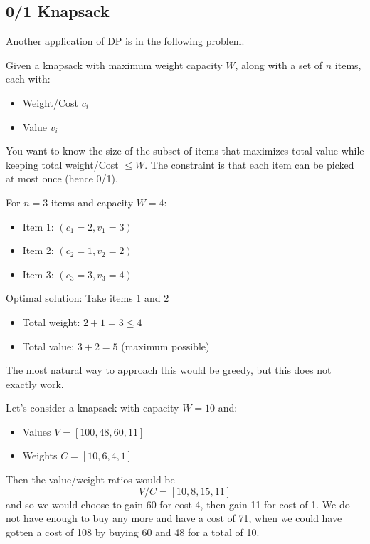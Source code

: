 \subsection{0/1 Knapsack} 

  Another application of DP is in the following problem. 

  \begin{definition}[0/1 Knapsack]
    \label{def:0-1-knapsack}
    Given a knapsack with maximum weight capacity $W$, along with a set of $n$ items, each with:
    \begin{itemize}
      \item Weight/Cost $c_i$
      \item Value $v_i$
    \end{itemize}
    You want to know the size of the subset of items that maximizes total value while keeping total weight/Cost $\leq W$. The constraint is that each item can be picked at most once (hence 0/1). 
  \end{definition}

  \begin{example}
    \label{ex:a-small-knapsack-instance}
    For $n = 3$ items and capacity $W = 4$:
    \begin{itemize}
      \item Item 1: $(c_1 = 2, v_1 = 3)$
      \item Item 2: $(c_2 = 1, v_2 = 2)$
      \item Item 3: $(c_3 = 3, v_3 = 4)$
    \end{itemize}
    Optimal solution: Take items 1 and 2
    \begin{itemize}
      \item Total weight: $2 + 1 = 3 \leq 4$
      \item Total value: $3 + 2 = 5$ (maximum possible)
    \end{itemize}
  \end{example}

  The most natural way to approach this would be greedy, but this does not exactly work. 

  \begin{example}
    \label{ex:counter-example-for-greedy-knapsack}
    Let's consider a knapsack with capacity $W = 10$ and:
    \begin{itemize}
      \item Values $V = [100, 48, 60, 11]$
      \item Weights $C = [10, 6, 4, 1]$
    \end{itemize}
    Then the value/weight ratios would be 
    \begin{equation}
      V/C = [10, 8, 15, 11]
    \end{equation}
    and so we would choose to gain 60 for cost 4, then gain 11 for cost of 1. We do not have enough to buy any more and have a cost of 71, when we could have gotten a cost of 108 by buying 60 and 48 for a total of 10. 
  \end{example}

